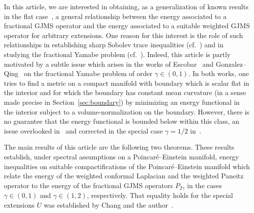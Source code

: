 \documentclass{amsart}
\theoremstyle{definition}
\theoremstyle{remark}
\numberwithin{equation}{section}
\begin{document}
In this article, we are interested in obtaining, as a generalization of known results in the flat case~\cite{Yang2013}, a general relationship between the energy associated to a fractional GJMS operator and the energy associated to a suitable weighted GJMS operator for arbitrary extensions.  One reason for this interest is the role of such relationships in establishing sharp Sobolev trace inequalities (cf.\ \cite{AcheChang2015,Escobar1988}) and in studying the fractional Yamabe problem (cf.\ \cite{Escobar1992a,GonzalezQing2010}).  Indeed, this article is partly motivated by a subtle issue which arises in the works of Escobar~\cite{Escobar1992a,Escobar1992ac} and Gonzalez--Qing~\cite{GonzalezQing2010} on the fractional Yamabe problem of order $\gamma\in(0,1)$.  In both works, one tries to find a metric on a compact manifold with boundary which is scalar flat in the interior and for which the boundary has constant mean curvature (in a sense made precise in Section~\ref{sec:boundary}) by minimizing an energy functional in the interior subject to a volume-normalization on the boundary.  However, there is no guarantee that the energy functional is bounded below within this class, an issue overlooked in~\cite{Escobar1992a,GonzalezQing2010} and corrected in the special case $\gamma=1/2$ in~\cite{Escobar1992ac}.

The main results of this article are the following two theorems.  These results establish, under spectral assumptions on a Poincar\'e--Einstein manifold, energy inequalities on suitable compactifications of the Poincar\'e--Einstein manifold which relate the energy of the weighted conformal Laplacian and the weighted Paneitz operator to the energy of the fractional GJMS operators $P_{2\gamma}$ in the cases $\gamma\in(0,1)$ and $\gamma\in(1,2)$, respectively.  That equality holds for the special extensions $U$ was established by Chang and the author~\cite{CaseChang2013}.
\end{document}
